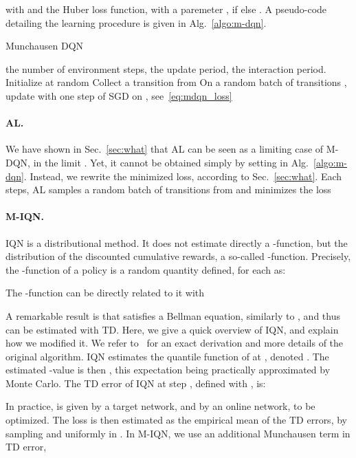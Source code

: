 \documentclass{article}
\begin{document}
with  and  the Huber loss function, with a paremeter ,  if    else . A pseudo-code detailing the learning procedure is given in Alg.~\ref{algo:m-dqn}. 

\begin{algorithm}[tbh]
\caption{Munchausen DQN }
\begin{algorithmic}\label{algo:m-dqn}
\REQUIRE  the number of environment steps,  the update period,  the interaction period.
\STATE Initialize  at random
\STATE 
\STATE 
\FOR{ \TO }
    \STATE Collect a transition  from 
    \STATE 
    \IF{}
        \STATE On a random batch of transitions , update  with one step of SGD on , see~\eqref{eq:mdqn_loss} 
    \ENDIF
    \IF{}
        \STATE 
    \ENDIF
\ENDFOR
\RETURN 
\end{algorithmic}
\end{algorithm}

\paragraph{AL.} We have shown in Sec.~\ref{sec:what} that AL can be seen as a limiting case of M-DQN, in the limit . Yet, it cannot be obtained simply by setting  in Alg.~\ref{algo:m-dqn}. Instead, we rewrite the minimized loss, according to Sec.~\ref{sec:what}. Each  steps, AL samples a random batch   of transitions from  and minimizes the loss


\paragraph{M-IQN.} IQN is a distributional method. It does not estimate directly a -function, but the distribution of the discounted cumulative rewards, a so-called -function. Precisely, the -function  of a policy   is a random quantity defined, for each  as:

The -function can be directly related to it with


A remarkable result is that  satisfies a Bellman equation, similarly to , and thus can be estimated with TD. Here, we give a quick  overview of IQN, and explain how we modified it. We refer to~\citet{dabney2018implicit} for an exact derivation and more details of the original algorithm. IQN estimates the quantile function of  at , denoted . The estimated -value is then , this expectation being practically approximated by Monte Carlo. The TD error of IQN at step , defined with , is:

In practice,  is given by a target network, and  by an online network, to be optimized.
The loss is then estimated as the empirical mean of the TD errors, by sampling  and  uniformly in . In M-IQN, we use an additional Munchausen term in TD error,
\end{document}
